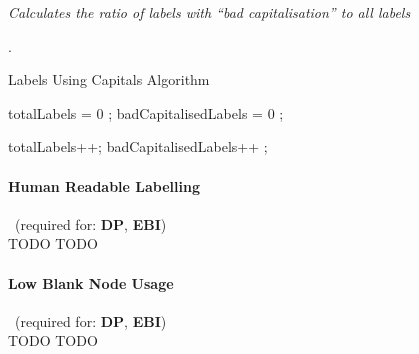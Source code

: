 \begin{mdframed}[style=metricdefinition]
\emph{Calculates the ratio of labels with ``bad capitalisation'' to all labels}
\end{mdframed}
.

\begin{algorithm}
\caption{Labels Using Capitals Algorithm}\label{lst:badCapitals}
\begin{algorithmic}[1]
\State totalLabels = 0 ;
\State badCapitalisedLabels = 0 ;
\EndProcedure

 totalLabels++; \EndIf
{} badCapitalisedLabels++ ; \EndIf
{}
\EndProcedure
\end{algorithmic}
\end{algorithm}

\paragraph{Human Readable Labelling}~(required for: \textbf{DP}, \textbf{EBI})~\\
TODO TODO

\paragraph{Low Blank Node Usage}~(required for: \textbf{DP}, \textbf{EBI})~\\
TODO TODO


